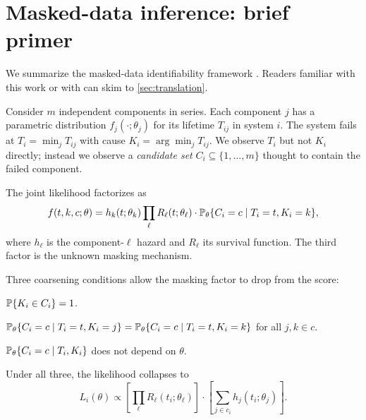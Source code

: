 \section{Masked-data inference: brief primer}
\label{sec:background}

We summarize the masked-data identifiability framework
\citep{towell2026masked,heitjan1991ignorability}. Readers familiar
with this work or with \citet{towell2026scrnacoarsening} can skim to
\cref{sec:translation}.

Consider $m$ independent components in series. Each component $j$
has a parametric distribution $f_j(\cdot;\theta_j)$ for its lifetime
$T_{ij}$ in system $i$. The system fails at $T_i = \min_j T_{ij}$
with cause $K_i = \arg\min_j T_{ij}$. We observe $T_i$ but not $K_i$
directly; instead we observe a \emph{candidate set} $C_i \subseteq
\{1,\ldots,m\}$ thought to contain the failed component.

The joint likelihood factorizes as
\begin{equation}
  f(t, k, c; \theta)
  = h_k(t; \theta_k) \prod_{\ell} R_\ell(t; \theta_\ell)
    \cdot \mathbb{P}_\theta\{C_i = c \mid T_i = t, K_i = k\},
  \label{eq:bg-joint}
\end{equation}
where $h_\ell$ is the component-$\ell$ hazard and $R_\ell$ its
survival function. The third factor is the unknown masking mechanism.

Three coarsening conditions allow the masking factor to drop from
the score:

\begin{condition}[Support, C1]
\label{cond:c1}
$\mathbb{P}\{K_i \in C_i\} = 1$.
\end{condition}

\begin{condition}[Symmetry, C2]
\label{cond:c2}
$\mathbb{P}_\theta\{C_i=c \mid T_i=t, K_i=j\} = \mathbb{P}_\theta\{C_i=c \mid
T_i=t, K_i=k\}$ for all $j,k \in c$.
\end{condition}

\begin{condition}
\label{cond:c3}
$\mathbb{P}_\theta\{C_i=c \mid T_i, K_i\}$ does not depend on $\theta$.
\end{condition}

Under all three, the likelihood collapses to
\begin{equation}
  L_i(\theta) \propto \left[\prod_\ell R_\ell(t_i;\theta_\ell)\right]
  \cdot \left[\sum_{j \in c_i} h_j(t_i; \theta_j)\right].
  \label{eq:bg-c1c2c3}
\end{equation}

